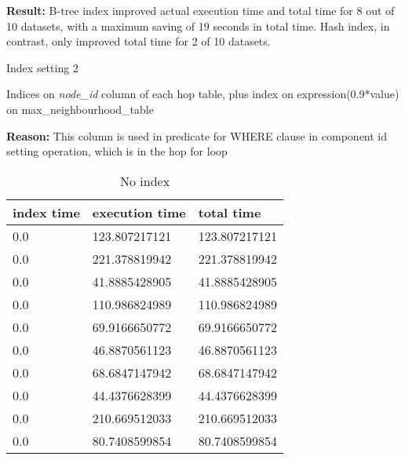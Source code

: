\begin{itemize*}
\par \textbf{Result:} B-tree index improved actual execution time and total time for 8 out of 10 datasets, with a maximum saving of 19 seconds in total time. Hash index, in contrast, only improved total time for 2 of 10 datasets.
\item{Index setting 2}
\par Indices on \textit{node\_id} column of each hop table, plus index on expression(0.9*value) on max\_neighbourhood\_table
\par \textbf{Reason:} This column is used in predicate for WHERE clause in component id setting operation, which is in the hop for loop

\begin{table}[H]
\begin{center}
\begin{tabular}{|l|l|l|}
\hline
index time & execution time & total time     \\ \hline
0.0 & 123.807217121 & 123.807217121 \\ \hline
0.0 & 221.378819942 & 221.378819942 \\ \hline
0.0 & 41.8885428905 & 41.8885428905 \\ \hline
0.0 & 110.986824989 & 110.986824989 \\ \hline
0.0 & 69.9166650772 & 69.9166650772 \\ \hline
0.0 & 46.8870561123 & 46.8870561123 \\ \hline
0.0 & 68.6847147942 & 68.6847147942 \\ \hline
0.0 & 44.4376628399 & 44.4376628399 \\ \hline
0.0 & 210.669512033 & 210.669512033 \\ \hline
0.0 & 80.7408599854 & 80.7408599854 \\ \hline
\end{tabular}
\end{center}
\caption{No index}
\end{table}


\end{itemize*}
